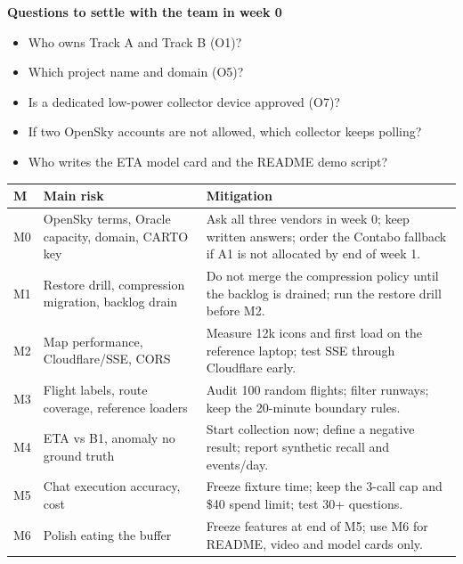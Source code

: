 \documentclass[10.5pt]{article}
\begin{document}
\vspace{3pt}
\begin{softcard}
{\bfseries Questions to settle with the team in week 0}
\vspace{2pt}
\begin{itemize}[leftmargin=1.2em,itemsep=2pt,topsep=2pt]
  \item Who owns Track A and Track B (O1)?
  \item Which project name and domain (O5)?
  \item Is a dedicated low-power collector device approved (O7)?
  \item If two OpenSky accounts are not allowed, which collector keeps polling?
  \item Who writes the ETA model card and the README demo script?
\end{itemize}
\end{softcard}

\newpage
{}

\begin{tabularx}{\linewidth}{@{}p{1.3cm} X X@{}}
\toprule
\textbf{M} & \textbf{Main risk} & \textbf{Mitigation} \\
\midrule
M0 & OpenSky terms, Oracle capacity, domain, CARTO key & Ask all three vendors in week 0; keep written answers; order the Contabo fallback if A1 is not allocated by end of week 1. \\
M1 & Restore drill, compression migration, backlog drain & Do not merge the compression policy until the backlog is drained; run the restore drill before M2. \\
M2 & Map performance, Cloudflare/SSE, CORS & Measure 12k icons and first load on the reference laptop; test SSE through Cloudflare early. \\
M3 & Flight labels, route coverage, reference loaders & Audit 100 random flights; filter runways; keep the 20-minute boundary rules. \\
M4 & ETA vs B1, anomaly no ground truth & Start collection now; define a negative result; report synthetic recall and events/day. \\
M5 & Chat execution accuracy, cost & Freeze fixture time; keep the 3-call cap and \$40 spend limit; test 30+ questions. \\
M6 & Polish eating the buffer & Freeze features at end of M5; use M6 for README, video and model cards only. \\
\bottomrule
\end{tabularx}
\end{document}
